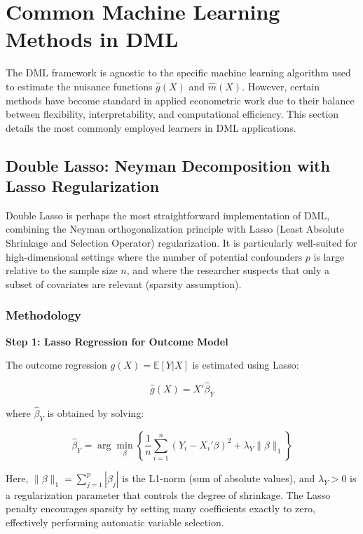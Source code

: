 \documentclass[12pt,a4paper]{article}
\begin{document}
\section{Common Machine Learning Methods in DML}

The DML framework is agnostic to the specific machine learning algorithm used to estimate the nuisance functions $\hat{g}(X)$ and $\hat{m}(X)$. However, certain methods have become standard in applied econometric work due to their balance between flexibility, interpretability, and computational efficiency. This section details the most commonly employed learners in DML applications.

\subsection{Double Lasso: Neyman Decomposition with Lasso Regularization}

Double Lasso is perhaps the most straightforward implementation of DML, combining the Neyman orthogonalization principle with Lasso (Least Absolute Shrinkage and Selection Operator) regularization. It is particularly well-suited for high-dimensional settings where the number of potential confounders $p$ is large relative to the sample size $n$, and where the researcher suspects that only a subset of covariates are relevant (sparsity assumption).

\subsubsection{Methodology}

\textbf{Step 1: Lasso Regression for Outcome Model}

The outcome regression $g(X) = \mathbb{E}[Y | X]$ is estimated using Lasso:

\begin{equation}
\hat{g}(X) = X'\hat{\beta}_Y
\end{equation}

where $\hat{\beta}_Y$ is obtained by solving:

\begin{equation}
\hat{\beta}_Y = \arg\min_{\beta} \left\{ \frac{1}{n} \sum_{i=1}^{n} (Y_i - X_i'\beta)^2 + \lambda_Y \|\beta\|_1 \right\}
\end{equation}

Here, $\|\beta\|_1 = \sum_{j=1}^{p} |\beta_j|$ is the L1-norm (sum of absolute values), and $\lambda_Y > 0$ is a regularization parameter that controls the degree of shrinkage. The Lasso penalty encourages sparsity by setting many coefficients exactly to zero, effectively performing automatic variable selection.
\end{document}
